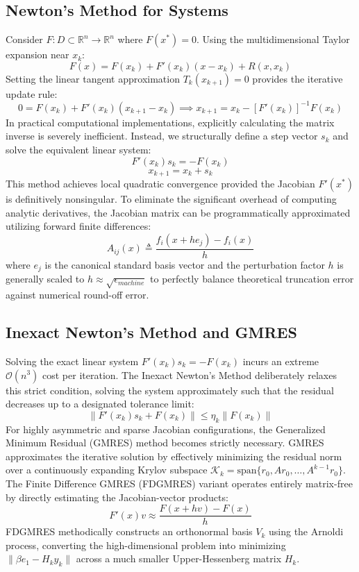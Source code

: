 \documentclass[12pt, a4paper]{article}
\theoremstyle{break}
\begin{document}
\subsection{Newton's Method for Systems}
Consider $F: D \subset \mathbb{R}^n \to \mathbb{R}^n$ where $F(x^*) = 0$. Using the multidimensional Taylor expansion near $x_k$:
$$F(x) = F(x_k) + F'(x_k)(x - x_k) + R(x, x_k)$$
Setting the linear tangent approximation $T_k(x_{k+1}) = 0$ provides the iterative update rule:
$$0 = F(x_k) + F'(x_k)(x_{k+1} - x_k) \implies x_{k+1} = x_k - [F'(x_k)]^{-1} F(x_k)$$
In practical computational implementations, explicitly calculating the matrix inverse is severely inefficient. Instead, we structurally define a step vector $s_k$ and solve the equivalent linear system:
$$F'(x_k) s_k = -F(x_k)$$
$$x_{k+1} = x_k + s_k$$
This method achieves local quadratic convergence provided the Jacobian $F'(x^*)$ is definitively nonsingular. To eliminate the significant overhead of computing analytic derivatives, the Jacobian matrix can be programmatically approximated utilizing forward finite differences:
$$A_{ij}(x) \triangleq \frac{f_i(x + h e_j) - f_i(x)}{h}$$
where $e_j$ is the canonical standard basis vector and the perturbation factor $h$ is generally scaled to $h \approx \sqrt{\epsilon_{machine}}$ to perfectly balance theoretical truncation error against numerical round-off error.

\subsection{Inexact Newton's Method and GMRES}
Solving the exact linear system $F'(x_k) s_k = -F(x_k)$ incurs an extreme $\mathcal{O}(n^3)$ cost per iteration. The Inexact Newton's Method deliberately relaxes this strict condition, solving the system approximately such that the residual decreases up to a designated tolerance limit:
$$\|F'(x_k) s_k + F(x_k)\| \le \eta_k \|F(x_k)\|$$
For highly asymmetric and sparse Jacobian configurations, the Generalized Minimum Residual (GMRES) method becomes strictly necessary. GMRES approximates the iterative solution by effectively minimizing the residual norm over a continuously expanding Krylov subspace $\mathcal{K}_k = \text{span}\{r_0, A r_0, \dots, A^{k-1} r_0\}$. 
The Finite Difference GMRES (FDGMRES) variant operates entirely matrix-free by directly estimating the Jacobian-vector products:
$$F'(x)v \approx \frac{F(x + hv) - F(x)}{h}$$
FDGMRES methodically constructs an orthonormal basis $V_k$ using the Arnoldi process, converting the high-dimensional problem into minimizing $\|\beta e_1 - H_k y_k\|$ across a much smaller Upper-Hessenberg matrix $H_k$.
\end{document}
